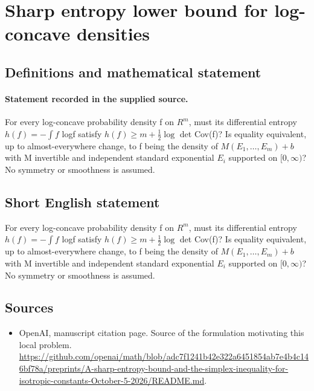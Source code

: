 \documentclass[11pt]{article}
\begin{document}
\section*{Sharp entropy lower bound for log-concave densities}\label{30007121}
\subsection{Definitions and mathematical statement}
\paragraph{Statement recorded in the supplied source.}
For every log-concave probability density f on $R^{m}$, must its differential entropy $h(f)=-\int f$ logf satisfy $h(f)\geq m+\tfrac12 \log $ det Cov(f)? Is equality equivalent, up to almost-everywhere change, to f being the density of $M(E_{1},\dots ,E_m)+b$ with M invertible and independent standard exponential $E_i$ supported on $[0,\infty )$? No symmetry or smoothness is assumed.
\subsection{Short English statement}
For every log-concave probability density f on $R^{m}$, must its differential entropy $h(f)=-\int f$ logf satisfy $h(f)\geq m+\tfrac12 \log $ det Cov(f)? Is equality equivalent, up to almost-everywhere change, to f being the density of $M(E_{1},\dots ,E_m)+b$ with M invertible and independent standard exponential $E_i$ supported on $[0,\infty )$? No symmetry or smoothness is assumed.
\subsection{Sources}
\begin{itemize}
\item[S1] OpenAI, manuscript citation page. Source of the formulation motivating this local problem.
\url{https://github.com/openai/math/blob/adc7f1241b42e322a6451854ab7e4b4c146bf78a/preprints/A-sharp-entropy-bound-and-the-simplex-inequality-for-isotropic-constants-October-5-2026/README.md}.
\end{itemize}
\end{document}
